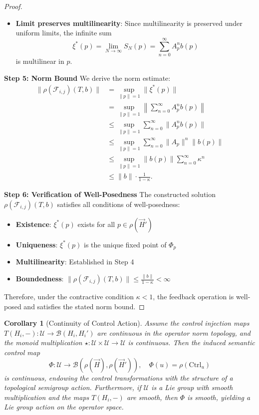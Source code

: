 \documentclass[11pt]{article}
\newtheorem{corollary}{Corollary}
\begin{document}
\begin{proof}
\begin{itemize}
    \item \textbf{Limit preserves multilinearity}: Since multilinearity is preserved under uniform limits, the infinite sum
    \[
    \xi^*(p) = \lim_{N\to\infty} S_N(p) = \sum_{n=0}^\infty A_p^n b(p)
    \]
    is multilinear in \( p \).
\end{itemize}

\noindent\textbf{Step 5: Norm Bound}
We derive the norm estimate:
\begin{align*}
\|\rho(\mathcal{F}_{i,j})(T,b)\| &= \sup_{\|p\| = 1} \|\xi^*(p)\| \\
&= \sup_{\|p\| = 1} \left\| \sum_{n=0}^\infty A_p^n b(p) \right\| \\
&\le \sup_{\|p\| = 1} \sum_{n=0}^\infty \|A_p^n b(p)\| \\
&\le \sup_{\|p\| = 1} \sum_{n=0}^\infty \|A_p\|^n \|b(p)\| \\
&\le \sup_{\|p\| = 1} \|b(p)\| \sum_{n=0}^\infty \kappa^n \\
&\le \|b\| \cdot \frac{1}{1 - \kappa}.
\end{align*}

\noindent\textbf{Step 6: Verification of Well-Posedness}
The constructed solution \( \rho(\mathcal{F}_{i,j})(T,b) \) satisfies all conditions of well-posedness:
\begin{itemize}
    \item \textbf{Existence}: \( \xi^*(p) \) exists for all \( p \in \rho(\vec{H}') \)
    \item \textbf{Uniqueness}: \( \xi^*(p) \) is the unique fixed point of \( \Phi_p \)
    \item \textbf{Multilinearity}: Established in Step 4
    \item \textbf{Boundedness}: \( \|\rho(\mathcal{F}_{i,j})(T,b)\| \le \frac{\|b\|}{1-\kappa} < \infty \)
\end{itemize}

Therefore, under the contractive condition \( \kappa < 1 \), the feedback operation is well-posed and satisfies the stated norm bound.
\end{proof}



\begin{corollary}[Continuity of Control Action]\label{cor:control-continuity}
Assume the control injection maps \( T(H_i, -): \mathcal{U} \to \mathcal{B}(H_i, H_i') \) are continuous in the operator norm topology, and the monoid multiplication \( \star: \mathcal{U} \times \mathcal{U} \to \mathcal{U} \) is continuous. Then the induced semantic control map
\[
\Phi: \mathcal{U} \to \mathcal{B}(\rho(\vec{H}), \rho(\vec{H}')), \quad \Phi(u) = \rho(\mathrm{Ctrl}_u)
\]
is continuous, endowing the control transformations with the structure of a topological semigroup action. Furthermore, if \( \mathcal{U} \) is a Lie group with smooth multiplication and the maps \( T(H_i, -) \) are smooth, then \( \Phi \) is smooth, yielding a Lie group action on the operator space.
\end{corollary}
\end{document}

